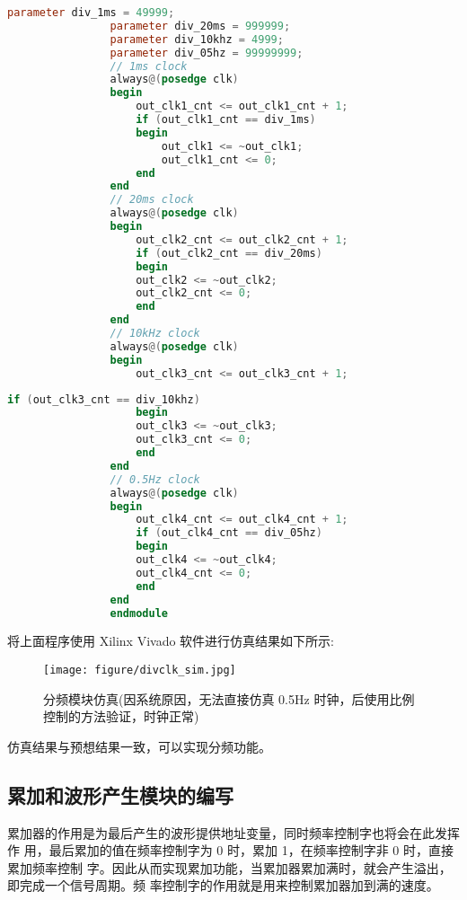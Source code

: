 {\begin{spacing}{1.5}
\begin{lstlisting}[language=Verilog]
                parameter div_1ms = 49999;
                parameter div_20ms = 999999;
                parameter div_10khz = 4999;
                parameter div_05hz = 99999999;
                // 1ms clock
                always@(posedge clk)
                begin
                    out_clk1_cnt <= out_clk1_cnt + 1;
                    if (out_clk1_cnt == div_1ms)
                    begin
                        out_clk1 <= ~out_clk1;
                        out_clk1_cnt <= 0;
                    end
                end
                // 20ms clock
                always@(posedge clk)
                begin
                    out_clk2_cnt <= out_clk2_cnt + 1;
                    if (out_clk2_cnt == div_20ms) 
                    begin
                    out_clk2 <= ~out_clk2;
                    out_clk2_cnt <= 0;
                    end
                end
                // 10kHz clock
                always@(posedge clk)
                begin
                    out_clk3_cnt <= out_clk3_cnt + 1;
			\end{lstlisting}
			\begin{lstlisting}[language=Verilog]
                    if (out_clk3_cnt == div_10khz) 
                    begin
                    out_clk3 <= ~out_clk3;
                    out_clk3_cnt <= 0;
                    end
                end
                // 0.5Hz clock
                always@(posedge clk)
                begin
                    out_clk4_cnt <= out_clk4_cnt + 1;
                    if (out_clk4_cnt == div_05hz) 
                    begin
                    out_clk4 <= ~out_clk4;
                    out_clk4_cnt <= 0;
                    end
                end
                endmodule
            \end{lstlisting}
			将上面程序使用 Xilinx Vivado 软件进行仿真结果如下所示:
			\newline
			\begin{figure}[htbp]
				\centering
				\texttt{[image: figure/divclk\_sim.jpg]}
				\caption{分频模块仿真(因系统原因，无法直接仿真 0.5Hz 时钟，后使用比例控制的方法验证，时钟正常)}\label{fig:divclk_sim}
			\end{figure}
			\newpage
			仿真结果与预想结果一致，可以实现分频功能。
		\subsection{累加和波形产生模块的编写}
			累加器的作用是为最后产生的波形提供地址变量，同时频率控制字也将会在此发挥作 用，最后累加的值在频率控制字为 0 时，累加 1，在频率控制字非 0 时，直接累加频率控制 字。因此从而实现累加功能，当累加器累加满时，就会产生溢出，即完成一个信号周期。频 率控制字的作用就是用来控制累加器加到满的速度。


\end{spacing}}

